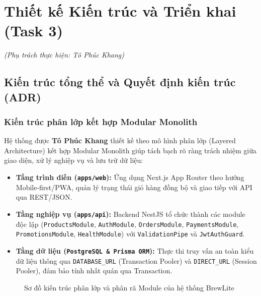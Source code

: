 \section{Thiết kế Kiến trúc và Triển khai (Task 3)}
\textit{(Phụ trách thực hiện: Tô Phúc Khang)}

\subsection{Kiến trúc tổng thể và Quyết định kiến trúc (ADR)}

\subsubsection{Kiến trúc phân lớp kết hợp Modular Monolith}
Hệ thống được \textbf{Tô Phúc Khang} thiết kế theo mô hình phân lớp (Layered Architecture) kết hợp Modular Monolith giúp tách bạch rõ ràng trách nhiệm giữa giao diện, xử lý nghiệp vụ và lưu trữ dữ liệu:
\begin{itemize}
    \item \textbf{Tầng trình diễn (\texttt{apps/web}):} Ứng dụng Next.js App Router theo hướng Mobile-first/PWA, quản lý trạng thái giỏ hàng đồng bộ và giao tiếp với API qua REST/JSON.
    \item \textbf{Tầng nghiệp vụ (\texttt{apps/api}):} Backend NestJS tổ chức thành các module độc lập (\texttt{ProductsModule}, \texttt{AuthModule}, \texttt{OrdersModule}, \texttt{PaymentsModule}, \texttt{PromotionsModule}, \texttt{HealthModule}) với \texttt{ValidationPipe} và \texttt{JwtAuthGuard}.
    \item \textbf{Tầng dữ liệu (\texttt{PostgreSQL \& Prisma ORM}):} Thực thi truy vấn an toàn kiểu dữ liệu thông qua \texttt{DATABASE\_URL} (Transaction Pooler) và \texttt{DIRECT\_URL} (Session Pooler), đảm bảo tính nhất quán qua Transaction.
\end{itemize}

\begin{figure}[H]
\centering
{}
\caption{Sơ đồ kiến trúc phân lớp và phân rã Module của hệ thống BrewLite}
\end{figure}

